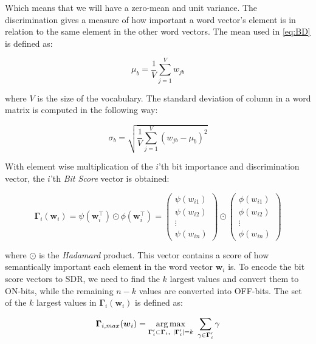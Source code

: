 Which means that we will have a zero-mean and unit variance. The discrimination gives a measure of how important a word vector's element is in relation to the same element in the other word vectors. The mean used in \autoref{eq:BD} is defined as:


\begin{equation}
    \mu_b = \frac{1}{V} \sum\limits_{j=1}^{V} w_{jb}
\end{equation}


where $V$ is the size of the vocabulary. The standard deviation of column in a word matrix is computed in the following way:


\begin{equation}
    \sigma_b = \sqrt{\frac{1}{V}\sum\limits_{j=1}^{V} ( w_{jb} - \mu_b )^2}
\end{equation}


\noindent With element wise multiplication of the $i$'th bit importance and discrimination vector, the $i$'th \textit{Bit Score} vector is obtained:


\begin{equation}
    \boldsymbol{\Gamma}_{i}(\boldsymbol{w}_{i}) = \psi(\boldsymbol{w}^{\top}_{i}) \odot \phi(\boldsymbol{w}^{\top}_{i}) = \begin{pmatrix}\psi(w_{i1})\\\psi(w_{i2})\\\vdots\\\psi(w_{in})\end{pmatrix} \odot \begin{pmatrix} \phi(w_{i1})\\\phi(w_{i2})\\\vdots\\\phi(w_{in})\end{pmatrix}
    \label{eq:bitscore}
\end{equation}


where $\odot$ is the \textit{Hadamard} product. This vector contains a score of how semantically important each element in the word vector $\boldsymbol{w}_i$ is. To encode the bit score vectors to SDR, we need to find the $k$ largest values and convert them to ON-bits, while the remaining $n-k$ values are converted into OFF-bits. The set of the $k$ largest values in $\boldsymbol{\Gamma}_{i}(\boldsymbol{w}_{i})$ is defined as:


\begin{equation}
    \boldsymbol{\Gamma}_{i,max}(\boldsymbol{w}_{i}) = \argmax\limits_{\boldsymbol {\Gamma}_{i}^{\prime} \subset\boldsymbol {\Gamma}_{i},\ |\boldsymbol{\Gamma}_{i}^{\prime}|=k}\ \sum\limits_{\gamma \in \boldsymbol{\Gamma}_{i}^{\prime}}\gamma
\end{equation}


